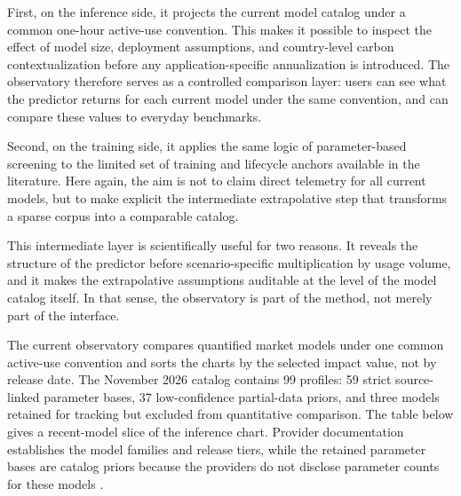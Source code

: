 \documentclass[11pt,a4paper]{article}
\begin{document}
First, on the inference side, it projects the current model catalog under a common one-hour active-use convention. This makes it possible to inspect the effect of model size, deployment assumptions, and country-level carbon contextualization before any application-specific annualization is introduced. The observatory therefore serves as a controlled comparison layer: users can see what the predictor returns for each current model under the same convention, and can compare these values to everyday benchmarks.

Second, on the training side, it applies the same logic of parameter-based screening to the limited set of training and lifecycle anchors available in the literature. Here again, the aim is not to claim direct telemetry for all current models, but to make explicit the intermediate extrapolative step that transforms a sparse corpus into a comparable catalog.

This intermediate layer is scientifically useful for two reasons. It reveals the structure of the predictor before scenario-specific multiplication by usage volume, and it makes the extrapolative assumptions auditable at the level of the model catalog itself. In that sense, the observatory is part of the method, not merely part of the interface.

The current observatory compares quantified market models under one common active-use convention and sorts the charts by the selected impact value, not by release date. The November 2026 catalog contains 99 profiles: 59 strict source-linked parameter bases, 37 low-confidence partial-data priors, and three models retained for tracking but excluded from quantitative comparison. The table below gives a recent-model slice of the inference chart. Provider documentation establishes the model families and release tiers, while the retained parameter bases are catalog priors because the providers do not disclose parameter counts for these models \cite{openai_gpt6_astra2026,openai_gpt6_solluna2026,openai_gpt61_sol2026,openai_gpt61_terra2026,anthropic_fablemythos2026,google_gemini4_carbon2026,google_gemini4_hydrogen2026}.
\end{document}
